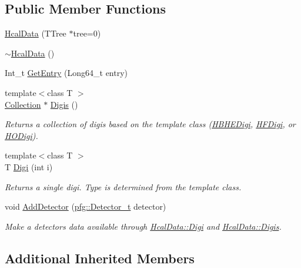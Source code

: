 \subsection*{Public Member Functions}
\begin{DoxyCompactItemize}
\item 
\hyperlink{class_hcal_data_a03e8c0684f3121d68944cd71d0c02817}{Hcal\+Data} (T\+Tree $\ast$tree=0)
\item 
\hyperlink{class_hcal_data_a6a6311896ad7d9aa300f01572cf2c9f5}{$\sim$\+Hcal\+Data} ()
\item 
Int\+\_\+t \hyperlink{class_hcal_data_aa5d32f6b744c860c647e213d4aff9ff4}{Get\+Entry} (Long64\+\_\+t entry)
\item 
{\footnotesize template$<$class T $>$ }\\\hyperlink{class_collection}{Collection} $\ast$ \hyperlink{class_hcal_data_a620712e779255411ccd8aedf375f430d}{Digis} ()
\begin{DoxyCompactList}\small\item\em Returns a collection of digis based on the template class (\hyperlink{class_h_b_h_e_digi}{H\+B\+H\+E\+Digi}, \hyperlink{class_h_f_digi}{H\+F\+Digi}, or \hyperlink{class_h_o_digi}{H\+O\+Digi}). \end{DoxyCompactList}\item 
{\footnotesize template$<$class T $>$ }\\T \hyperlink{class_hcal_data_a36161d851fde7fb81c4d1b616ff09680}{Digi} (int i)
\begin{DoxyCompactList}\small\item\em Returns a single digi. Type is determined from the template class. \end{DoxyCompactList}\item 
void \hyperlink{class_hcal_data_ac2257a06065a51a4c23d4007beb8ad64}{Add\+Detector} (\hyperlink{namespacepfg_a90b6d47b5ff56bc3ebabb0f6b6088d60}{pfg\+::\+Detector\+\_\+t} detector)
\begin{DoxyCompactList}\small\item\em Make a detector\textquotesingle{}s data available through \hyperlink{class_hcal_data_a36161d851fde7fb81c4d1b616ff09680}{Hcal\+Data\+::\+Digi} and \hyperlink{class_hcal_data_a620712e779255411ccd8aedf375f430d}{Hcal\+Data\+::\+Digis}. \end{DoxyCompactList}\end{DoxyCompactItemize}
\subsection*{Additional Inherited Members}


